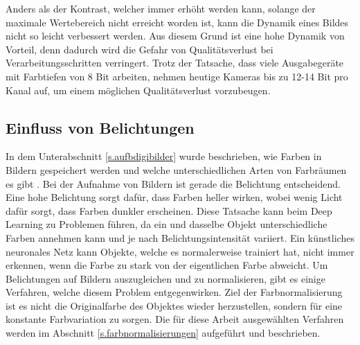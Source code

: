 Anders als der Kontrast, welcher immer erhöht werden kann, solange der maximale Wertebereich nicht erreicht worden ist, kann die Dynamik eines Bildes nicht so leicht verbessert werden. Aus diesem Grund ist eine hohe Dynamik von Vorteil, denn dadurch wird die Gefahr von Qualitätsverlust bei Verarbeitungsschritten verringert. Trotz der Tatsache, dass viele Ausgabegeräte mit Farbtiefen von 8 Bit arbeiten, nehmen heutige Kameras bis zu 12-14 Bit pro Kanal auf, um einem möglichen Qualitätsverlust vorzubeugen.
\subsection{Einfluss von Belichtungen}\label{s.belichtung}
In dem Unterabschnitt \ref{s.aufbdigibilder} wurde beschrieben, wie Farben in Bildern gespeichert werden und welche unterschiedlichen Arten von Farbräumen es gibt \cite[41ff.]{burger2009digitale}. Bei der Aufnahme von Bildern ist gerade die Belichtung entscheidend. Eine hohe Belichtung sorgt dafür, dass Farben heller wirken, wobei wenig Licht dafür sorgt, dass Farben dunkler erscheinen. Diese Tatsache kann beim Deep Learning zu Problemen führen, da ein und dasselbe Objekt unterschiedliche Farben annehmen kann und je nach Belichtungsintensität variiert. Ein künstliches neuronales Netz kann Objekte, welche es normalerweise trainiert hat, nicht immer erkennen, wenn die Farbe zu stark von der eigentlichen Farbe abweicht. Um Belichtungen auf Bildern auszugleichen und zu normalisieren, gibt es einige Verfahren, welche diesem Problem entgegenwirken. Ziel der Farbnormalisierung ist es nicht die Originalfarbe des Objektes wieder herzustellen, sondern für eine konstante Farbvariation zu sorgen. Die für diese Arbeit ausgewählten Verfahren werden im Abschnitt \ref{s.farbnormalisierungen} aufgeführt und beschrieben. 
